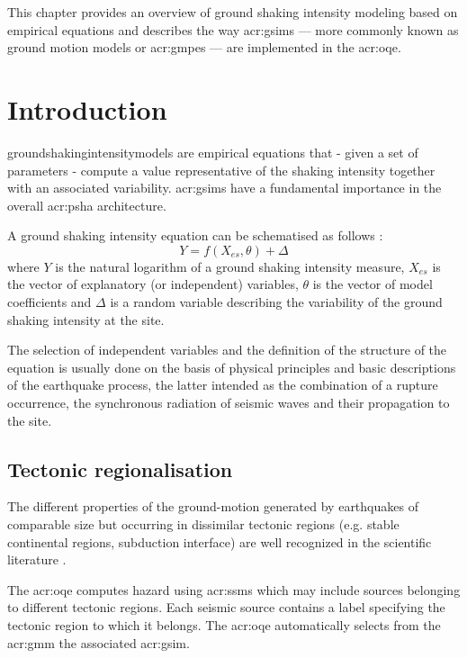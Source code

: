 This chapter provides an overview of ground shaking intensity modeling based 
on empirical equations and describes the way \glspl{acr:gsim} --- more commonly 
known as ground motion models or \glspl{acr:gmpe} --- are implemented in the 
\gls{acr:oqe}.
%
\section{Introduction}
%
\Glspl{groundshakingintensitymodel} are empirical equations that - given a 
set of parameters - compute a value representative of the shaking 
intensity together with an associated variability. 
%
\glspl{acr:gsim} have a fundamental importance in the overall \gls{acr:psha} 
architecture.

A ground shaking intensity equation can be schematised as follows 
\parencite{alatik2010}: 
\begin{equation}
Y = f(X_{es},\theta)+\Delta
\end{equation}
where $Y$ is the natural logarithm of a ground shaking intensity measure, 
$X_{es}$ is the vector of explanatory (or independent) variables, $\theta$ 
is the vector of model coefficients and $\Delta$ is a random variable 
describing the variability of the ground shaking intensity at the site.

The selection of independent variables and the definition of the structure 
of the equation is usually done on the basis of physical principles and 
basic descriptions of the earthquake process, the latter
intended as the combination of a rupture occurrence, the synchronous 
radiation of seismic waves and their propagation to the site.
%
\subsection{Tectonic regionalisation}
The different properties of the ground-motion generated by earthquakes 
of comparable size but occurring in dissimilar tectonic regions (e.g. 
stable continental regions, subduction interface) are well recognized in 
the scientific literature \parencite{abrahamson1997}.

The \gls{acr:oqe} computes hazard using \glspl{acr:ssm} which may include 
sources belonging to different tectonic regions. 
%
Each seismic source contains a label specifying 
the tectonic region to which it belongs. The \gls{acr:oqe} automatically 
selects from the \gls{acr:gmm} the associated \gls{acr:gsim}.

